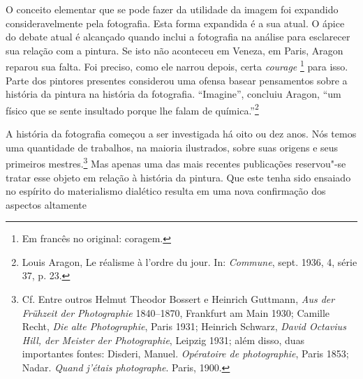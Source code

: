 O conceito elementar que se pode fazer da utilidade da imagem foi
expandido consideravelmente pela fotografia. Esta forma expandida é a
sua atual. O ápice do debate atual é alcançado quando inclui a
fotografia na análise para esclarecer sua relação com a pintura. Se isto
não aconteceu em Veneza, em Paris, Aragon reparou sua falta. Foi
preciso, como ele narrou depois, certa \emph{courage} \footnote{Em
  francês no original: coragem. \versal{[N. T.]}} para isso. Parte dos pintores presentes
considerou uma ofensa basear pensamentos sobre a história da pintura na
história da fotografia. ``Imagine'', concluiu Aragon, ``um físico que se
sente insultado porque lhe falam de química.''\footnote{Louis Aragon, Le
  réalisme à l'ordre du jour. In: \emph{Commune}, sept. 1936, 4, série
  37, p. 23.}

A história da fotografia começou a ser investigada há oito ou dez anos.
Nós temos uma quantidade de trabalhos, na maioria ilustrados, sobre suas
origens e seus primeiros mestres.\footnote{Cf. Entre outros Helmut
  Theodor Bossert e Heinrich Guttmann, \emph{Aus der Frühzeit der
  Photographie} 1840--1870, Frankfurt am Main 1930; Camille Recht,
  \emph{Die alte Photographie}, Paris 1931; Heinrich Schwarz,
  \emph{David Octavius Hill, der Meister der Photographie}, Leipzig
  1931; além disso, duas importantes fontes: Disderi, Manuel.
  \emph{Opératoire de photographie}, Paris 1853; Nadar. \emph{Quand
  j'étais photographe}. Paris, 1900.} Mas apenas uma das mais recentes
publicações reservou"-se tratar esse objeto em relação à história da
pintura. Que este tenha sido ensaiado no espírito do materialismo
dialético resulta em uma nova confirmação dos aspectos altamente
